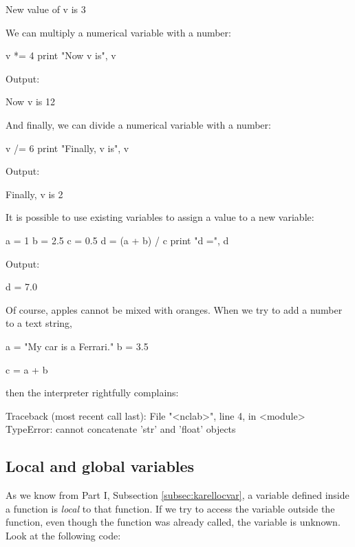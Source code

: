 \begin{greencode}
New value of v is 3
\end{greencode}
We can multiply a numerical variable with a number:

\begin{bluecode}
v *= 4
print "Now v is", v
\end{bluecode}
Output:

\begin{greencode}
Now v is 12
\end{greencode}
And finally, we can divide a numerical variable with a number:

\begin{bluecode}
v /= 6
print "Finally, v is", v
\end{bluecode}
Output:

\begin{greencode}
Finally, v is 2
\end{greencode}
It is possible to use existing variables to assign a value to a new variable:

\begin{bluecode}
a = 1
b = 2.5
c = 0.5
d = (a + b) / c
print "d =", d
\end{bluecode}
Output:

\begin{greencode}
d = 7.0
\end{greencode}
Of course, apples cannot be mixed with oranges. When we try to 
add a number to a text string,

\begin{bluecode}
a = "My car is a Ferrari."
b = 3.5

c = a + b
\end{bluecode}
then the interpreter rightfully complains:

\begin{redcode}
Traceback (most recent call last):
  File "<nclab>", line 4, in <module>
TypeError: cannot concatenate 'str' and 'float' objects
\end{redcode}

\subsection{Local and global variables} \label{subsec:pythonlocvar}

As we know from Part I, Subsection \ref{subsec:karellocvar}, a variable defined 
inside a function is {\em local} to that function. If we try to access 
the variable outside the function, even though the function was 
already called, the variable is  unknown. Look at the following 
code:

